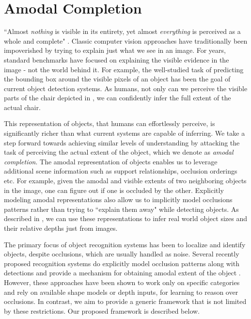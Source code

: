 \section{Amodal Completion}
``Almost \textit{nothing} is visible in its entirety, yet almost \textit{everything} is perceived as a whole and complete" \cite{palmer1999vision}.
Classic computer vision approaches have traditionally been impoverished by trying to explain just what we see in an image. For years, standard benchmarks have focused on explaining the visible evidence in the image - not the world behind it. For example, the well-studied task of predicting the bounding box around the visible pixels of an object has been the goal of current object detection systems. As humans, not only can we perceive the visible parts of the chair depicted in , we can confidently infer the full extent of the actual chair.

This representation of objects, that humans can effortlessly perceive, is significantly richer than what current systems are capable of inferring. We take a step forward towards achieving similar levels of understanding by attacking the task of perceiving the actual extent of the object, which we denote as \textit{amodal completion}. The amodal representation of objects enables us to leverage additional scene information such as support relationships, occlusion orderings etc. For example, given the amodal and visible extents of two neighboring objects in the image, one can figure out if one is occluded by the other. Explicitly modeling amodal representations also allow us to implicitly model occlusions patterns rather than trying to ``explain them away" while detecting objects. As described in , we can use these representations to infer real world object sizes and their relative depths just from images.

The primary focus of object recognition systems \cite{girshick2013rich,felzens_latent_pami10} has been to localize and identify objects, despite occlusions, which are usually handled as noise. Several recently proposed recognition systems do explicitly model occlusion patterns along with detections and provide a mechanism for obtaining amodal extent of the object \cite{ghiasi2014parsing, xiang_cvpr15, zia2014towards}. However, these approaches have been shown to work only on specific categories and rely on available shape models or depth inputs, for learning to reason over occlusions. In contrast, we aim to provide a generic framework that is not limited by these restrictions. Our proposed framework is described below.

